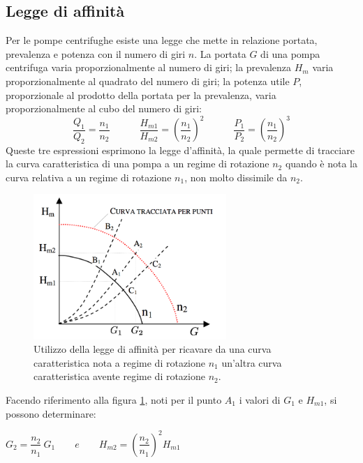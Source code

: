 \documentclass[laurea,oneside,11pt]{USiena_tesiLM}
\begin{document}
\subsection{Legge di affinità}
Per le pompe centrifughe esiste una legge che mette in relazione portata, prevalenza e potenza con il numero di giri $n$.
La portata $G$ di una pompa centrifuga varia proporzionalmente al numero di giri; la prevalenza $H_m$ varia proporzionalmente al quadrato del numero di giri; la potenza utile $P$, proporzionale al prodotto della portata per la prevalenza, varia proporzionalmente al cubo del numero di giri:
\begin{equation}
\frac{Q_1}{Q_2}=\frac{n_1}{n_2} \quad \qquad  \frac{H_{m1}}{H_{m2}}=\left( \frac{n_1}{n_2}\right)^2 \quad \qquad  \frac{P_1}{P_2}=\left( \frac{n_1}{n_2}\right)^3
\label{eq:affinita}
\end{equation}
Queste tre espressioni esprimono la legge d'affinità, la quale permette di tracciare la curva caratteristica di una pompa a un regime di rotazione $n_2$ quando è nota la curva relativa a un regime di rotazione $n_1$, non molto dissimile da $n_2$.

\begin{figure}[!ht]
\centering
\includegraphics[width=0.65\textwidth]{figure/affinita} 
\caption{Utilizzo della legge di affinità per ricavare da una curva caratteristica nota a regime di rotazione $n_1$ un'altra curva caratteristica avente regime di rotazione $n_2$.}
\label{fig:affinita}
\end{figure}

Facendo riferimento alla figura \ref{fig:affinita}, noti per il punto $A_1$ i valori di $G_1$ e $H_{m1}$, si possono determinare:

\begin{center}
$G_2 = \dfrac{n_2}{n_1} \ G_1 \qquad e \qquad H_{m2} = \left( \dfrac{n_2}{n_1}\right)^2  H_{m1}$
\end{center}
\end{document}
